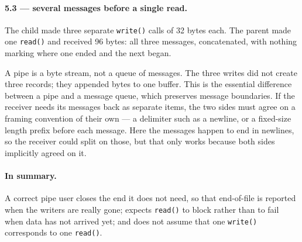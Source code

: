 \paragraph{5.3 --- several messages before a single read.}
The child made three separate \texttt{write()} calls of 32 bytes each. The parent
made one \texttt{read()} and received 96 bytes: all three messages, concatenated,
with nothing marking where one ended and the next began.

A pipe is a byte stream, not a queue of messages. The three writes did not create
three records; they appended bytes to one buffer. This is the essential difference
between a pipe and a message queue, which preserves message boundaries. If the
receiver needs its messages back as separate items, the two sides must agree on a
framing convention of their own --- a delimiter such as a newline, or a fixed-size
length prefix before each message. Here the messages happen to end in newlines, so
the receiver could split on those, but that only works because both sides
implicitly agreed on it.

\paragraph{In summary.}
A correct pipe user closes the end it does not need, so that end-of-file is
reported when the writers are really gone; expects \texttt{read()} to block rather
than to fail when data has not arrived yet; and does not assume that one
\texttt{write()} corresponds to one \texttt{read()}.
